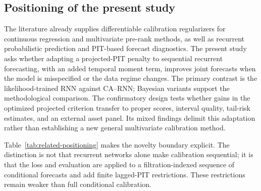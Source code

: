 \documentclass[11pt]{article}
\begin{document}
\subsection{Positioning of the present study}

The literature already supplies differentiable calibration regularizers for
continuous regression and multivariate pre-rank methods, as well as recurrent
probabilistic prediction and PIT-based forecast diagnostics. The present study
asks whether adapting a projected-PIT penalty to sequential recurrent
forecasting, with an added temporal moment term, improves joint forecasts when
the model is misspecified or the data regime changes. The primary contrast is
the likelihood-trained RNN against CA--RNN; Bayesian variants support the
methodological comparison. The confirmatory design tests whether gains in the
optimized projected criterion transfer to proper scores, interval quality,
tail-risk estimates, and an external asset panel. Its mixed findings delimit
this adaptation rather than establishing a new general multivariate
calibration method.

Table~\ref{tab:related-positioning} makes the novelty boundary explicit. The
distinction is not that recurrent networks alone make calibration sequential;
it is that the loss and evaluation are applied to a filtration-indexed sequence
of conditional forecasts and add finite lagged-PIT restrictions. These
restrictions remain weaker than full conditional calibration.

\begin{table}[ht]
\centering
\caption{Positioning relative to the closest calibration literature. ``Shift''
means an explicit out-of-distribution or regime evaluation, not ordinary
held-out testing.}
\label{tab:related-positioning}
\small
{}
\end{table}
\end{document}
